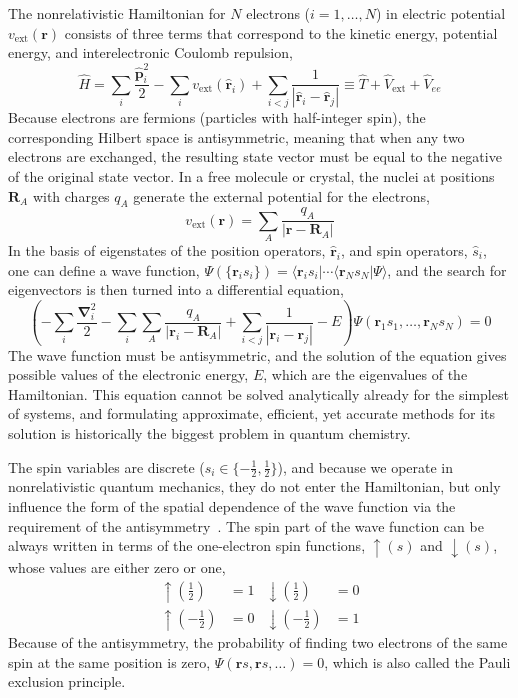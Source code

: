 The nonrelativistic Hamiltonian for $N$ electrons ($i=1,\ldots,N$) in electric potential $v_\text{ext}(\mathbf r)$ consists of three terms that correspond to the kinetic energy, potential energy, and interelectronic Coulomb repulsion,
\begin{equation}
  \hat H=\sum_i\frac{\mathbf{\hat p}_i^2}2-\sum_i v_\text{ext}(\mathbf{\hat r}_i)+\sum_{i<j}\frac1{|\mathbf{\hat r}_i-\mathbf{\hat r}_j|}\equiv\hat T+\hat V_\text{ext}+\hat V_{ee}
  \label{eq:el-hamiltonian}
\end{equation}
Because electrons are fermions (particles with half-integer spin), the corresponding Hilbert space is antisymmetric, meaning that when any two electrons are exchanged, the resulting state vector must be equal to the negative of the original state vector.
In a free molecule or crystal, the nuclei at positions $\mathbf R_A$ with charges $q_A$ generate the external potential for the electrons,
\begin{equation}
  v_\text{ext}(\mathbf r)=\sum_A\frac{q_A}{|\mathbf r-\mathbf R_A|}
\end{equation}
In the basis of eigenstates of the position operators, $\mathbf{\hat r}_i$, and spin operators, $\hat s_i$, one can define a wave function, $\Psi(\{\mathbf r_i s_i\})=\langle\mathbf r_i s_i|\cdots\langle\mathbf r_N s_N|\Psi\rangle$, and the search for eigenvectors is then turned into a differential equation,
\begin{equation}
  \left(-\sum_i\frac{\boldsymbol\nabla_i^2}2-\sum_i\sum_A\frac{q_A}{|\mathbf r_i-\mathbf R_A|}+\sum_{i<j}\frac1{|\mathbf r_i-\mathbf r_j|}-E\right)\Psi(\mathbf r_1 s_1,\ldots,\mathbf r_N s_N)=0
\end{equation}
The wave function must be antisymmetric, and the solution of the equation gives possible values of the electronic energy, $E$, which are the eigenvalues of the Hamiltonian.
This equation cannot be solved analytically already for the simplest of systems, and formulating approximate, efficient, yet accurate methods for its solution is historically the biggest problem in quantum chemistry.

The spin variables are discrete ($s_i\in\{-\frac12,\frac12\}$), and because we operate in nonrelativistic quantum mechanics, they do not enter the Hamiltonian, but only influence the form of the spatial dependence of the wave function via the requirement of the antisymmetry~\cite{Pauncz79}.
The spin part of the wave function can be always written in terms of the one-electron spin functions, $\uparrow\!(s)$ and $\downarrow\!(s)$, whose values are either zero or one,
\begin{equation}
\begin{aligned}
  \uparrow\!(\tfrac12)&=1 & \downarrow\!(\tfrac12)&=0 \\
  \uparrow\!(-\tfrac12)&=0 & \downarrow\!(-\tfrac12)&=1
\end{aligned}
\end{equation}
Because of the antisymmetry, the probability of finding two electrons of the same spin at the same position is zero, $\Psi(\mathbf rs,\mathbf rs,\ldots)=0$, which is also called the Pauli exclusion principle.

